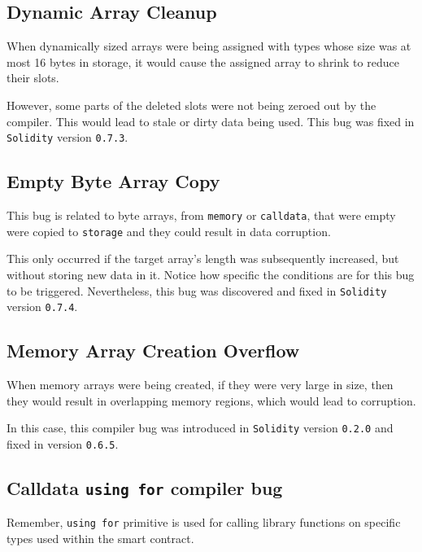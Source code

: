 \subsection{Dynamic Array Cleanup}\label{dynamic-array-cleanup}

When dynamically sized arrays were being assigned with types whose size
was at most 16 bytes in storage, it would cause the assigned array to
shrink to reduce their slots.

However, some parts of the deleted slots were not being zeroed out by
the compiler. This would lead to stale or dirty data being used. This
bug was fixed in \texttt{Solidity} version \texttt{0.7.3}.

\subsection{Empty Byte Array Copy}\label{empty-byte-array-copy}

This bug is related to byte arrays, from \texttt{memory} or
\texttt{calldata}, that were empty were copied to \texttt{storage} and
they could result in data corruption.

This only occurred if the target array's length was subsequently
increased, but without storing new data in it. Notice how specific the
conditions are for this bug to be triggered. Nevertheless, this bug was
discovered and fixed in \texttt{Solidity} version \texttt{0.7.4}.

\subsection{Memory Array Creation
Overflow}\label{memory-array-creation-overflow}

When memory arrays were being created, if they were very large in size,
then they would result in overlapping memory regions, which would lead
to corruption.

In this case, this compiler bug was introduced in \texttt{Solidity}
version \texttt{0.2.0} and fixed in version \texttt{0.6.5}.

\subsection{\texorpdfstring{Calldata \texttt{using\ for} compiler
bug}{Calldata using for compiler bug}}\label{calldata-using-for-compiler-bug}

Remember, \texttt{using\ for} primitive is used for calling library
functions on specific types used within the smart contract.

